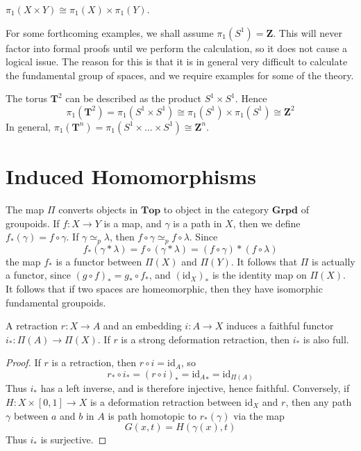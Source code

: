 \begin{corollary}
    $\pi_1(X \times Y) \cong \pi_1(X) \times \pi_1(Y)$.
\end{corollary}

For some forthcoming examples, we shall assume $\pi_1(S^1) = \mathbf{Z}$. This will never factor into formal proofs until we perform the calculation, so it does not cause a logical issue. The reason for this is that it is in general very difficult to calculate the fundamental group of spaces, and we require examples for some of the theory.

\begin{example}
    The torus $\mathbf{T}^2$ can be described as the product $S^1 \times S^1$. Hence
    \[ \pi_1(\mathbf{T}^2) = \pi_1(S^1 \times S^1) \cong \pi_1(S^1) \times \pi_1(S^1) \cong \mathbf{Z}^2 \]
    In general, $\pi_1(\mathbf{T}^n) = \pi_1(S^1 \times \dots \times S^1) \cong \mathbf{Z}^n$.
\end{example}





\section{Induced Homomorphisms}

The map $\Pi$ converts objects in $\textbf{Top}$  to object in the category $\textbf{Grpd}$ of groupoids. If $f: X \to Y$ is a map, and $\gamma$ is a path in $X$, then we define $f_*(\gamma) = f \circ \gamma$. If $\gamma \simeq_p \lambda$, then $f \circ \gamma \simeq_p f \circ \lambda$. Since
%
\[ f_*(\gamma * \lambda) = f \circ (\gamma * \lambda) = (f \circ \gamma) * (f \circ \lambda) \]
%
the map $f_*$ is a functor between $\Pi(X)$ and $\Pi(Y)$. It follows that $\Pi$ is actually a functor, since $(g \circ f)_* = g_* \circ f_*$, and ${(\text{id}_X)}_*$ is the identity map on $\Pi(X)$. It follows that if two spaces are homeomorphic, then they have isomorphic fundamental groupoids.

\begin{theorem}
    A retraction $r: X \to A$ and an embedding $i: A \to X$ induces a faithful functor $i_*: \Pi(A) \to \Pi(X)$. If $r$ is a strong deformation retraction, then $i_*$ is also full.
\end{theorem}
\begin{proof}
    If $r$ is a retraction, then $r \circ i = \text{id}_A$, so
    \[ r_* \circ i_* = (r \circ i)_* = {\text{id}_A}_* = \text{id}_{\Pi(A)} \]
    Thus $i_*$ has a left inverse, and is therefore injective, hence faithful. Conversely, if $H: X \times [0,1] \to X$ is a deformation retraction between $\text{id}_X$ and $r$, then any path $\gamma$ between $a$ and $b$ in $A$ is path homotopic to $r_*(\gamma)$ via the map
    \[ G(x,t) = H(\gamma(x),t) \]
    Thus $i_*$ is surjective.
\end{proof}

